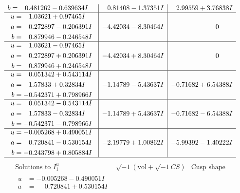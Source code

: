 \documentclass[1p]{elsarticle_modified}
\theoremstyle{definition}
\newcommand{\I}{\sqrt{-1}}
\begin{document}
$$\begin{array}{c|c|c}
\begin{aligned}
b &= \phantom{-}0.481262 - 0.639634 I\end{aligned}
 & \phantom{-}0.81408 - 1.37351 I & \phantom{-}2.99559 + 3.76838 I \\ \hline\begin{aligned}
u &= \phantom{-}1.03621 + 0.97465 I \\
a &= \phantom{-}0.272897 - 0.206391 I \\
b &= \phantom{-}0.879946 - 0.246548 I\end{aligned}
 & -4.42034 - 8.30464 I & \phantom{-0.000000 } 0 \\ \hline\begin{aligned}
u &= \phantom{-}1.03621 - 0.97465 I \\
a &= \phantom{-}0.272897 + 0.206391 I \\
b &= \phantom{-}0.879946 + 0.246548 I\end{aligned}
 & -4.42034 + 8.30464 I & \phantom{-0.000000 } 0 \\ \hline\begin{aligned}
u &= \phantom{-}0.051342 + 0.543114 I \\
a &= \phantom{-}1.57833 + 0.32834 I \\
b &= -0.542371 + 0.798966 I\end{aligned}
 & -1.14789 - 5.43637 I & -0.71682 + 6.54388 I \\ \hline\begin{aligned}
u &= \phantom{-}0.051342 - 0.543114 I \\
a &= \phantom{-}1.57833 - 0.32834 I \\
b &= -0.542371 - 0.798966 I\end{aligned}
 & -1.14789 + 5.43637 I & -0.71682 - 6.54388 I \\ \hline\begin{aligned}
u &= -0.005268 + 0.490051 I \\
a &= \phantom{-}0.720841 - 0.530154 I \\
b &= -0.243798 + 0.805884 I\end{aligned}
 & -2.19779 + 1.00862 I & -5.99392 - 1.40222 I\\
 \hline 
 \end{array}$$\newpage$$\begin{array}{c|c|c}  
\text{Solutions to }I^u_{1}& \I (\text{vol} + \sqrt{-1}CS) & \text{Cusp shape}\\
 \hline 
\begin{aligned}
u &= -0.005268 - 0.490051 I \\
a &= \phantom{-}0.720841 + 0.530154 I \\

\end{aligned}
\end{array}$$
\end{document}
